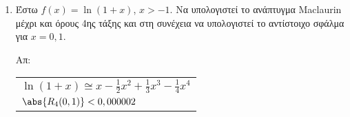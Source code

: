 \begin{enumerate}
    \item Έστω $ f(x) = \ln{(1+x)} $, $ x>-1 $. Να υπολογιστεί το ανάπτυγμα
      Maclaurin μέχρι και όρους 4ης τάξης και στη συνέχεια να
      υπολογιστεί το αντίστοιχο σφάλμα για $ x = 0,1 $.

      \hfill Απ: \begin{tabular}{l}
        $ \ln(1+x) \cong x - \frac{1}{2} x^{2} + \frac{1}{3}x^{3} - 
        \frac{1}{4} x^{4} $ \\ 
        $ \abs{R_{4}(0,1)} < 0,000002$	
      \end{tabular}
  \end{enumerate}


  
